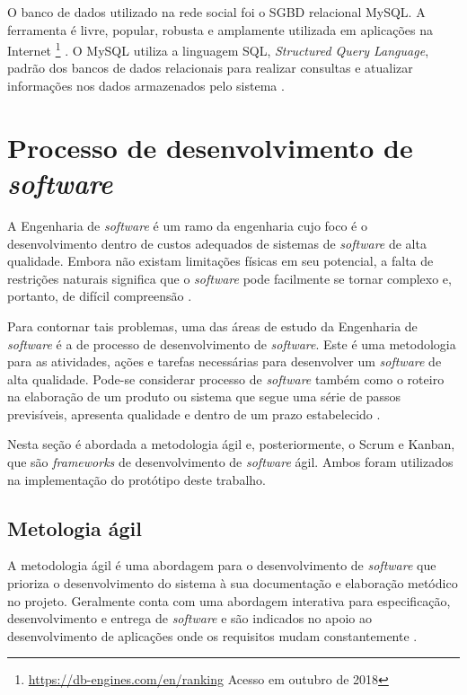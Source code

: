 O banco de dados utilizado na rede social foi o SGBD relacional MySQL. A ferramenta é livre, popular, robusta e amplamente utilizada em aplicações na Internet \footnote{\url{https://db-engines.com/en/ranking} Acesso em outubro de 2018} \cite{mysql}. O MySQL utiliza a linguagem SQL, \textit{Structured Query Language}, padrão dos bancos de dados relacionais para realizar consultas e atualizar informações nos dados armazenados pelo sistema \cite{sqlCompleteBook}.

\section{Processo de desenvolvimento de \textit{software}}

A Engenharia de \textit{software} é um ramo da engenharia cujo foco é o desenvolvimento dentro de custos adequados de sistemas de \textit{software} de alta qualidade. Embora não existam limitações físicas em seu potencial, a falta de restrições naturais significa que o \textit{software} pode facilmente se tornar complexo e, portanto, de difícil compreensão \cite{sommerville}.

Para contornar tais problemas, uma das áreas de estudo da Engenharia de \textit{software} é a de processo de desenvolvimento de \textit{software}. Este é uma metodologia para as atividades, ações e tarefas necessárias para desenvolver um \textit{software} de alta qualidade. Pode-se considerar processo de \textit{software} também como o roteiro na elaboração de um produto ou sistema que segue uma série de passos previsíveis, apresenta qualidade e dentro de um prazo estabelecido \cite{pressman}.

Nesta seção é abordada a metodologia ágil e, posteriormente, o Scrum e Kanban, que são \textit{frameworks} de desenvolvimento de \textit{software} ágil. Ambos foram utilizados na implementação do protótipo deste trabalho.


\subsection{Metologia ágil}
\label{fundSWAgil}

A metodologia ágil é uma abordagem para o desenvolvimento de \textit{software} que prioriza o desenvolvimento do sistema à sua documentação e elaboração metódico no projeto. Geralmente conta com uma abordagem interativa para especificação, desenvolvimento e entrega de \textit{software} e são indicados no apoio ao desenvolvimento de aplicações onde os requisitos mudam constantemente \cite{sommerville}.


